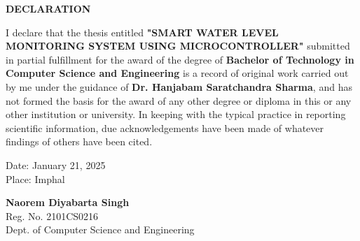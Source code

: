 \vspace*{0.6cm}
\begin{center}
    \fontsize{16}{19}\selectfont
    \textbf{DECLARATION}\\[0.5cm]
\end{center}
\vspace{1cm}
{
\fontsize{12}{14}\selectfont
\noindent
I declare that the thesis entitled \textbf{"SMART WATER LEVEL MONITORING SYSTEM USING MICROCONTROLLER"} submitted in partial fulfillment for the award of the degree of \textbf{Bachelor of Technology in Computer Science and Engineering} is a record of original work carried out by me under the guidance of \textbf{Dr. Hanjabam Saratchandra Sharma}, and has not formed the basis for the award of any other degree or diploma in this or any other institution or university. In keeping with the typical practice in reporting scientific information, due acknowledgements have been made of whatever findings of others have been cited.

\vspace{2cm}
\noindent
\noindent
\begin{minipage}[t]{0.45\textwidth} %
    \begin{flushleft}
        Date: January 21, 2025\\
        Place: Imphal
    \end{flushleft}
\end{minipage}%
\hfill %
\begin{minipage}[t]{0.40\textwidth} %
    \begin{flushright}
        \begin{center}
            \textbf{Naorem Diyabarta Singh}\\
            Reg. No. 2101CS0216\\
            Dept. of Computer Science and Engineering
        \end{center}
    \end{flushright}
\end{minipage}
} 



